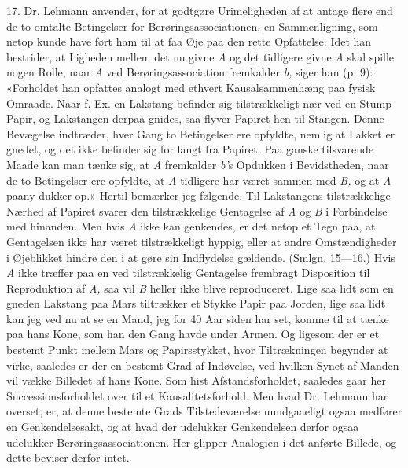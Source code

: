 \documentclass[12pt,a4paper,openany]{book}
\newcommand{\opage}[1]{\marginnote{\footnotesize\textit{[#1]}}}
\begin{document}
17. Dr. Lehmann anvender, for at godtgøre Urimeligheden af at antage flere end
de to omtalte Betingelser for Berøringsassociationen, en Sammenligning, som
netop kunde have ført ham til at faa Øje paa den rette Opfattelse. Idet han
bestrider, at Ligheden mellem det nu givne \textit{A} og det tidligere givne
\textit{A} skal spille nogen Rolle, naar \textit{A} ved Berøringsassociation
fremkalder \textit{b,} siger han (p. 9): «Forholdet han %
opfattes analogt med ethvert Kausalsammenhæng paa fysisk Omraade. Naar f. Ex.
en Lakstang befinder sig tilstrækkeligt nær ved en Stump Papir, og Lakstangen
derpaa gnides, saa flyver Papiret hen til Stangen. Denne Bevægelse indtræder,
hver Gang to Betingelser ere opfyldte, nemlig at Lakket er gnedet, og det ikke
befinder sig for langt fra Papiret. Paa ganske tilsvarende Maade kan man tænke
sig, at \textit{A} fremkalder \textit{b'}s Opdukken i Bevidstheden, naar de to
Betingelser ere opfyldte, at \textit{A} tidligere har været sammen med
\textit{B,} og at \textit{A} paany dukker op.» Hertil bemærker jeg følgende.
Til Lakstangens tilstrækkelige Nærhed af Papiret svarer den tilstrækkelige
Gentagelse af \textit{A} og \textit{B} i Forbindelse med hinanden. Men hvis
\textit{A} ikke kan genkendes, er det netop et Tegn paa, at Gentagelsen ikke
har været tilstrækkeligt
\setcounter{footnote}{0}%
\opage{40}hyppig, eller at andre Omstændigheder i Øjeblikket hindre den i at
gøre sin Indflydelse gældende. (Smlgn. 15---16.) Hvis \textit{A} ikke træffer
paa en ved tilstrækkelig Gentagelse frembragt Disposition til Reproduktion af
\textit{A,} saa vil \textit{B} heller ikke blive reproduceret. Lige saa lidt
som en gneden Lakstang paa Mars tiltrækker et Stykke Papir paa Jorden, lige saa
lidt kan jeg ved nu at se en Mand, jeg for 40 Aar siden har set, komme til at
tænke paa hans Kone, som han den Gang havde under Armen. Og ligesom der er et
bestemt Punkt mellem Mars og Papirsstykket, hvor Tiltrækningen begynder at
virke, saaledes er der en bestemt Grad af Indøvelse, ved hvilken Synet af
Manden vil vække Billedet af hans Kone. Som hist Afstandsforholdet, saaledes
gaar her Successionsforholdet over til et Kausalitetsforhold. Men hvad Dr.
Lehmann har overset, er, at denne bestemte Grads Tilstedeværelse uundgaaeligt
ogsaa medfører en Genkendelsesakt, og at hvad der udelukker Genkendelsen derfor
ogsaa udelukker Berøringsassociationen. Her glipper Analogien i det anførte
Billede, og dette beviser derfor intet.
\end{document}
